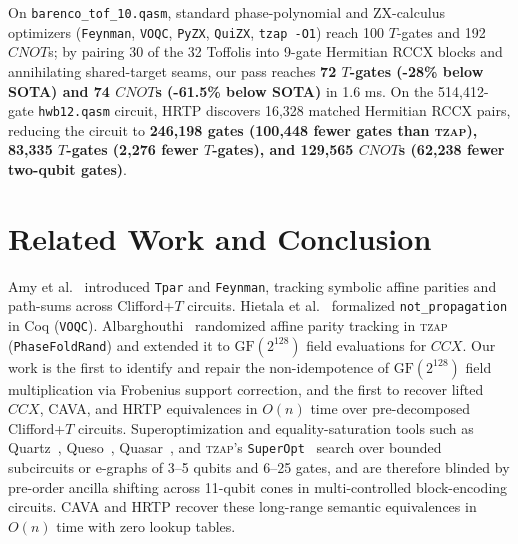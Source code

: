 \documentclass[11pt,a4paper]{article}
\theoremstyle{definition}
\begin{document}
On \texttt{barenco\_tof\_10.qasm}, standard phase-polynomial and ZX-calculus optimizers (\texttt{Feynman}, \texttt{VOQC}, \texttt{PyZX}, \texttt{QuiZX}, \texttt{tzap -O1}) reach 100 $T$-gates and 192 $\mathit{CNOT}$s; by pairing 30 of the 32 Toffolis into 9-gate Hermitian \textsc{RCCX} blocks and annihilating shared-target seams, our pass reaches \textbf{72 $T$-gates (-28\% below SOTA) and 74 $\mathit{CNOT}$s (-61.5\% below SOTA)} in 1.6 ms. On the 514,412-gate \texttt{hwb12.qasm} circuit, \textsc{HRTP} discovers 16,328 matched Hermitian \textsc{RCCX} pairs, reducing the circuit to \textbf{246,198 gates (100,448 fewer gates than \textsc{tzap}), 83,335 $T$-gates (2,276 fewer $T$-gates), and 129,565 $\mathit{CNOT}$s (62,238 fewer two-qubit gates)}.

\section{Related Work and Conclusion}
\label{sec:related}

Amy et al.~\cite{amy2014} introduced \texttt{Tpar} and \texttt{Feynman}, tracking symbolic affine parities and path-sums across Clifford+$T$ circuits. Hietala et al.~\cite{hietala2021} formalized \texttt{not\_propagation} in Coq (\texttt{VOQC}). Albarghouthi~\cite{albarghouthi2026rand} randomized affine parity tracking in \textsc{tzap} (\texttt{PhaseFoldRand}) and extended it to $\mathrm{GF}(2^{128})$ field evaluations for $\mathit{CCX}$. Our work is the first to identify and repair the non-idempotence of $\mathrm{GF}(2^{128})$ field multiplication via Frobenius support correction, and the first to recover lifted $\mathit{CCX}$, \textsc{CAVA}, and \textsc{HRTP} equivalences in $O(n)$ time over pre-decomposed Clifford+$T$ circuits. Superoptimization and equality-saturation tools such as Quartz~\cite{xu2022quartz}, Queso~\cite{xu2023queso}, Quasar~\cite{yang2026quasar}, and \textsc{tzap}'s \texttt{SuperOpt}~\cite{albarghouthi2026murm} search over bounded subcircuits or e-graphs of 3--5 qubits and 6--25 gates, and are therefore blinded by pre-order ancilla shifting across 11-qubit cones in multi-controlled block-encoding circuits. \textsc{CAVA} and \textsc{HRTP} recover these long-range semantic equivalences in $O(n)$ time with zero lookup tables.
\end{document}
